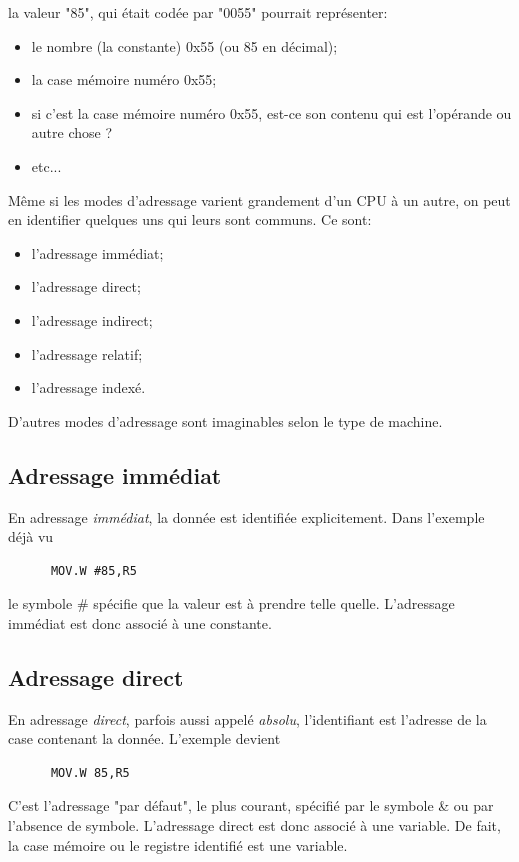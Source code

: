 la valeur "85", qui était codée par "0055" pourrait représenter:
\begin{itemize}[label=\textbullet,font=\small]
\item le nombre (la constante) 0x55 (ou 85 en décimal);
\item la case mémoire numéro 0x55;
\item si c'est la case mémoire numéro 0x55, est-ce son contenu qui est l'opérande ou autre chose ?
\item etc...
\end{itemize}

Même si les modes d'adressage varient grandement d'un CPU à un autre, on peut en identifier quelques uns qui leurs sont communs. Ce sont:
\begin{itemize}[label=\textbullet,font=\small]
\item l'adressage immédiat;
\item l'adressage direct;
\item l'adressage indirect;
\item l'adressage relatif;
\item l'adressage indexé.
\end{itemize}

D'autres modes d'adressage sont imaginables selon le type de machine.

\subsection{Adressage immédiat}
En adressage \textit{immédiat}, la donnée est identifiée explicitement. Dans l'exemple déjà vu 
\lstset{style=customc}
\begin{lstlisting}
      MOV.W #85,R5
\end{lstlisting}

le symbole \# spécifie que la valeur est à prendre telle quelle.
L'adressage immédiat est donc associé à une constante.

\subsection{Adressage direct}
En adressage \textit{direct}, parfois aussi appelé \textit{absolu}, l'identifiant est l'adresse de la case contenant la donnée. L'exemple devient
\lstset{style=customc}
\begin{lstlisting}
      MOV.W 85,R5
\end{lstlisting}
C'est l'adressage "par défaut", le plus courant, spécifié par le symbole \& ou par l'absence de symbole. L'adressage direct est donc associé à une variable. De fait, la case mémoire ou le registre identifié est une variable.

